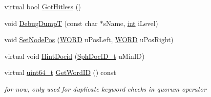 \begin{DoxyCompactItemize}
virtual bool \hyperlink{classExtTwofer__c_ab8fdc8b06b5e83126449839a0a9512ac}{Got\-Hitless} ()
\item 
void \hyperlink{classExtTwofer__c_a7b5f10734057b47b0220a722487655f0}{Debug\-Dump\-T} (const char $\ast$s\-Name, \hyperlink{sphinxexpr_8cpp_a4a26e8f9cb8b736e0c4cbf4d16de985e}{int} i\-Level)
\item 
void \hyperlink{classExtTwofer__c_a7e4504825e08b635c418cd2edccb804a}{Set\-Node\-Pos} (\hyperlink{sphinxstd_8h_a197942eefa7db30960ae396d68339b97}{W\-O\-R\-D} u\-Pos\-Left, \hyperlink{sphinxstd_8h_a197942eefa7db30960ae396d68339b97}{W\-O\-R\-D} u\-Pos\-Right)
\item 
virtual void \hyperlink{classExtTwofer__c_a67d883338768af16bb5bc380fd9b3237}{Hint\-Docid} (\hyperlink{sphinx_8h_a3176771631c12a9e4897272003e6b447}{Sph\-Doc\-I\-D\-\_\-t} u\-Min\-I\-D)
\item 
virtual \hyperlink{sphinxstd_8h_aaa5d1cd013383c889537491c3cfd9aad}{uint64\-\_\-t} \hyperlink{classExtTwofer__c_a00b5d0774c86372ad1d2d4a1d0c794f9}{Get\-Word\-I\-D} () const 
\begin{DoxyCompactList}\small\item\em for now, only used for duplicate keyword checks in quorum operator \end{DoxyCompactList}\end{DoxyCompactItemize}
